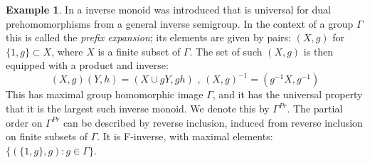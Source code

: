 \documentclass[11pt,a4paper]{amsart}
\theoremstyle{plain}
\theoremstyle{definition}%
\newtheorem{example}[theorem]{Example}%
\theoremstyle{remark}%
\begin{document}
\begin{example}
In \cite{MR745358,MR2221438} a inverse monoid was introduced that is universal for dual prehomomorphisms from a general inverse semigroup. In the context of a group $\Gamma$ this is called the \textit{prefix expansion}; its elements are given by pairs: $(X,g)$ for $\lbrace 1,g\rbrace \subset X$, where $X$ is a finite subset of $\Gamma$. The set of such $(X,g)$ is then equipped with a product and inverse:
\begin{equation*}
(X,g)(Y,h) = (X\cup gY,gh)\mbox{ , } (X,g)^{-1}=(g^{-1}X,g^{-1})
\end{equation*}
This has maximal group homomorphic image $\Gamma$, and it has the universal property that it is the largest such inverse monoid. We denote this by $\Gamma^{Pr}$. The partial order on $\Gamma^{Pr}$ can be described by reverse inclusion, induced from reverse inclusion on finite subsets of $\Gamma$. It is F-inverse, with maximal elements: $\lbrace(\lbrace 1,g \rbrace, g):g \in \Gamma \rbrace$.
\end{example}
\end{document}
